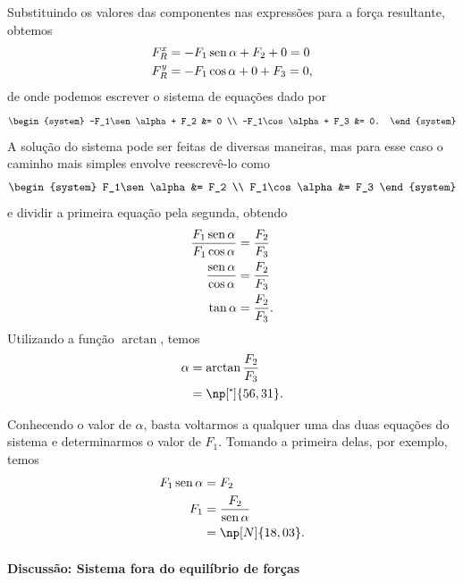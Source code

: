Substituindo os valores das componentes nas expressões para a força resultante, obtemos
\begin{align}
    F_R^x &= -F_1\operatorname{sen}\alpha + F_2 + 0 = 0 \\
    F_R^y &= -F_1\cos\alpha + 0 + F_3 = 0,
\end{align} 
%
de onde podemos escrever o sistema de equações dado por
\begin{equation}
\begin{system}
    -F_1\sen\alpha + F_2 &= 0 \\
    -F_1\cos\alpha + F_3 &= 0.
\end{system}
\end{equation}
%
A solução do sistema pode ser feitas de diversas maneiras, mas para esse caso o caminho mais simples envolve reescrevê-lo como
\begin{equation}
\begin{system}
    F_1\sen\alpha &= F_2 \\
    F_1\cos\alpha &= F_3
\end{system}
\end{equation}
%
e dividir a primeira equação pela segunda, obtendo
\begin{align}
    \frac{F_1\operatorname{sen}\alpha}{F_1\cos\alpha} &= \frac{F_2}{F_3} \\
    \frac{\operatorname{sen}\alpha}{\cos\alpha} &= \frac{F_2}{F_3} \\
    \tan\alpha &= \frac{F_2}{F_3}.
\end{align}
%
Utilizando a função $\arctan$, temos
\begin{align}
    \alpha &= \arctan\frac{F_2}{F_3} \\
    &= \np[\tcdegree]{56,31}.
\end{align}

Conhecendo o valor de $\alpha$, basta voltarmos a qualquer uma das duas equações do sistema e determinarmos o valor de $F_1$. Tomando a primeira delas, por exemplo, temos
\begin{align}
    F_1 \sen\alpha &= F_2 \\
    F_1 &= \frac{F_2}{\sen\alpha} \\
    &= \np[N]{18,03}.
\end{align}

\paragraph{Discussão: Sistema fora do equilíbrio de forças}

